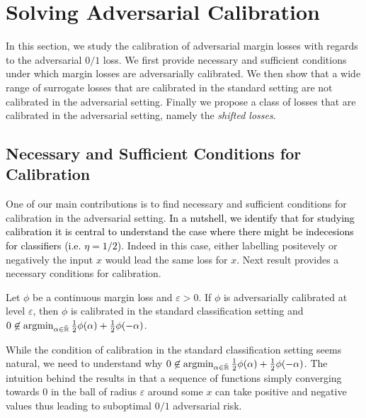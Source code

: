 \section{Solving Adversarial Calibration}
\label{sec:calibration}
In this section,  we study the calibration of adversarial margin losses with regards to the adversarial $0/1$ loss. We first provide necessary and sufficient conditions under which margin losses are adversarially calibrated. We then show that a wide range of surrogate losses that are calibrated in the standard setting are not calibrated in the adversarial setting. Finally we propose a class of losses that are calibrated in the adversarial setting, namely the \emph{shifted losses}.

\subsection{Necessary and Sufficient Conditions for Calibration}

One of our main contributions is to find necessary and sufficient conditions for calibration in the adversarial setting. \textcolor{black}{In a nutshell, we identify that for studying calibration it is central to understand  the case where there might be indecesions for classifiers (i.e. $\eta=1/2$)}. Indeed in this case, either labelling positevely or negatively the input $x$ would lead the same loss for $x$. Next result provides a necessary conditions for calibration. 

\begin{thm} 
\label{thm:calibration-nec}
Let $\phi$  be a continuous margin loss and $\varepsilon>0$. If $\phi$ is adversarially  calibrated at level $\varepsilon$, then $\phi$ is  calibrated in the standard classification setting and $0\not\in \operatorname*{argmin}_{\alpha\in\bar{\mathbb{R}}}
\frac12\phi(\alpha)+\frac12\phi(-\alpha)$. 
\end{thm}

While the condition of calibration in the standard classification setting seems natural, we need to understand why $0\not\in \operatorname*{argmin}_{\alpha\in\bar{\mathbb{R}}}
\frac12\phi(\alpha)+\frac12\phi(-\alpha)$. The intuition behind the results in that a sequence of functions simply converging towards $0$ in the ball of radius $\varepsilon$ around some $x$ can take positive and negative values thus leading to suboptimal $0/1$ adversarial risk. 

